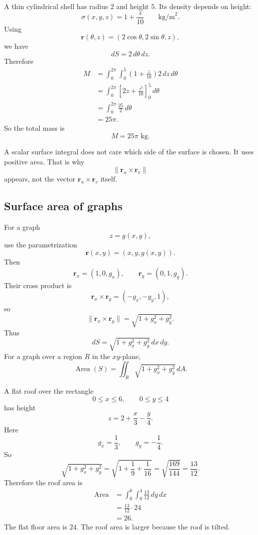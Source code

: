 \begin{example}
A thin cylindrical shell has radius \(2\) and height \(5\).  Its density depends on height:
\[
    \sigma(x,y,z)=1+\frac{z}{10}
    \qquad \text{kg/m}^2.
\]
Using
\[
    \mathbf r(\theta,z)=(2\cos\theta,2\sin\theta,z),
\]
we have
\[
    dS=2\,d\theta\,dz.
\]
Therefore
\[
\begin{aligned}
M
&=
\int_0^{2\pi}\int_0^5
\left(1+\frac{z}{10}\right)2\,dz\,d\theta\\
&=
\int_0^{2\pi}
\left[
2z+\frac{z^2}{10}
\right]_0^5
\,d\theta\\
&=
\int_0^{2\pi}
\frac{25}{2}
\,d\theta\\
&=
25\pi.
\end{aligned}
\]
So the total mass is
\[
\boxed{
    M=25\pi\text{ kg}.
}
\]
\end{example}

A scalar surface integral does not care which side of the surface is chosen.  It uses
positive area.  That is why
\[
    \|\mathbf r_u\times\mathbf r_v\|
\]
appears, not the vector \(\mathbf r_u\times\mathbf r_v\) itself.

\subsection{Surface area of graphs}

For a graph
\[
    z=g(x,y),
\]
use the parametrization
\[
    \mathbf r(x,y)=(x,y,g(x,y)).
\]
Then
\[
    \mathbf r_x=(1,0,g_x),
    \qquad
    \mathbf r_y=(0,1,g_y).
\]
Their cross product is
\[
    \mathbf r_x\times \mathbf r_y=(-g_x,-g_y,1),
\]
so
\[
    \|\mathbf r_x\times \mathbf r_y\|
    =
    \sqrt{1+g_x^2+g_y^2}.
\]
Thus
\[
\boxed{
    dS=\sqrt{1+g_x^2+g_y^2}\,dx\,dy.
}
\]
For a graph over a region \(R\) in the \(xy\)-plane,
\[
\boxed{
    \operatorname{Area}(S)
    =
    \iint_R
    \sqrt{1+g_x^2+g_y^2}\,dA.
}
\]

\begin{example}
A flat roof over the rectangle
\[
    0\le x\le6,
    \qquad
    0\le y\le4
\]
has height
\[
    z=2+\frac{x}{3}-\frac{y}{4}.
\]
Here
\[
    g_x=\frac13,
    \qquad
    g_y=-\frac14.
\]
So
\[
\sqrt{1+g_x^2+g_y^2}
=
\sqrt{1+\frac19+\frac1{16}}
=
\sqrt{\frac{169}{144}}
=
\frac{13}{12}.
\]
Therefore the roof area is
\[
\begin{aligned}
    \operatorname{Area}
    &=
    \int_0^6\int_0^4 \frac{13}{12}\,dy\,dx\\
    &=
    \frac{13}{12}\cdot24\\
    &=
    26.
\end{aligned}
\]
The flat floor area is \(24\).  The roof area is larger because the roof is tilted.
\end{example}

